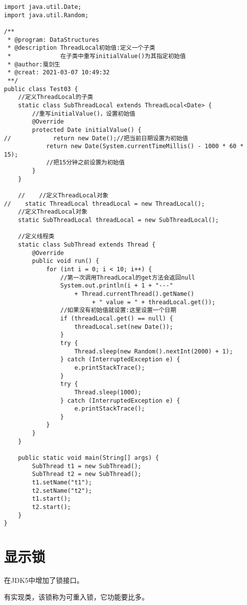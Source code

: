 \documentclass[a4paper]{report}
\begin{document}
\begin{Verbatim}[frame=single,numbersep=5pt,xleftmargin=1.5em,xrightmargin=1.5em]
import java.util.Date;
import java.util.Random;

/**
 * @program: DataStructures
 * @description ThreadLocal初始值:定义一个子类
 *              在子类中重写initialValue()为其指定初始值
 * @author:戛剑生
 * @creat: 2021-03-07 10:49:32
 **/
public class Test03 {
    //定义ThreadLocal的子类
    static class SubThreadLocal extends ThreadLocal<Date> {
        //重写initialValue()，设置初始值
        @Override
        protected Date initialValue() {
//            return new Date();//把当前日期设置为初始值
            return new Date(System.currentTimeMillis() - 1000 * 60 * 15);
            //把15分钟之前设置为初始值
        }
    }

    //    //定义ThreadLocal对象
//    static ThreadLocal threadLocal = new ThreadLocal();
    //定义ThreadLocal对象
    static SubThreadLocal threadLocal = new SubThreadLocal();

    //定义线程类
    static class SubThread extends Thread {
        @Override
        public void run() {
            for (int i = 0; i < 10; i++) {
                //第一次调用ThreadLocal的get方法会返回null
                System.out.println(i + 1 + "---" 
                    + Thread.currentThread().getName() 
                         + " value = " + threadLocal.get());
                //如果没有初始值就设置:这里设置一个日期
                if (threadLocal.get() == null) {
                    threadLocal.set(new Date());
                }
                try {
                    Thread.sleep(new Random().nextInt(2000) + 1);
                } catch (InterruptedException e) {
                    e.printStackTrace();
                }
                try {
                    Thread.sleep(1000);
                } catch (InterruptedException e) {
                    e.printStackTrace();
                }
            }
        }
    }

    public static void main(String[] args) {
        SubThread t1 = new SubThread();
        SubThread t2 = new SubThread();
        t1.setName("t1");
        t2.setName("t2");
        t1.start();
        t2.start();
    }
}\end{Verbatim}
\chapter{显示锁}
在JDK5中增加了锁接口。

有实现类，该锁称为可重入锁，它功能要比多。
\end{document}

